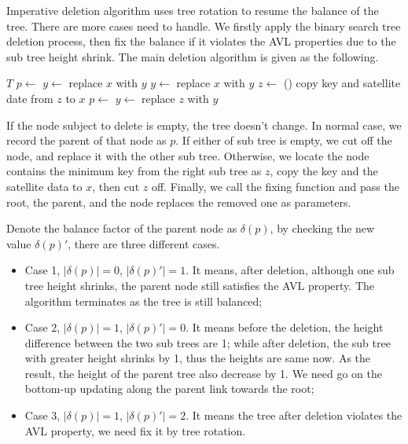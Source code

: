 \documentclass[b5paper]{article}
\begin{document}
Imperative deletion algorithm uses tree rotation to resume the balance of the tree.
There are more cases need to handle. We firstly apply the binary search tree deletion
process, then fix the balance if it violates the AVL properties due to the sub tree
height shrink. The main deletion algorithm is given as the following.

\begin{algorithmic}[1]
    \State \Return $T$
  \EndIf
  \State $p \gets$ 
    \State $y \gets $ 
    \State replace $x$ with $y$
    \State $y \gets $ 
    \State replace $x$ with $y$
  \Else
    \State $z \gets$ ()
    \State copy key and satellite date from $z$ to $x$
    \State $p \gets$ 
    \State $y \gets$ 
    \State replace $z$ with $y$
  \EndIf
  \State \Return {}
\EndFunction
\end{algorithmic}

If the node subject to delete is empty, the tree doesn't change. In normal case,
we record the parent of that node as $p$. If either of sub tree is empty, we
cut off the node, and replace it with the other sub tree. Otherwise, we locate
the node contains the minimum key from the right sub tree as $z$, copy the key and the
satellite data to $x$, then cut $z$ off. Finally, we call the fixing function
and pass the root, the parent, and the node replaces the removed one as parameters.

Denote the balance factor of the parent node as $\delta(p)$, by checking the new value
$\delta(p)'$, there are three different cases.

\begin{itemize}
\item Case 1, $|\delta(p)| = 0$, $|\delta(p)'| = 1$. It means, after deletion,
although one sub tree height shrinks, the parent node still satisfies the AVL
property. The algorithm terminates as the tree is still balanced;
\item Case 2, $|\delta(p)| = 1$, $|\delta(p)'| = 0$. It means before the deletion,
the height difference between the two sub trees are 1; while after deletion, the
sub tree with greater height shrinks by 1, thus the heights are same now. As the
result, the height of the parent tree also decrease by 1. We need go on the
bottom-up updating along the parent link towards the root;
\item Case 3, $|\delta(p)| = 1$, $|\delta(p)'| = 2$. It means the tree after deletion
violates the AVL property, we need fix it by tree rotation.
\end{itemize}
\end{document}
